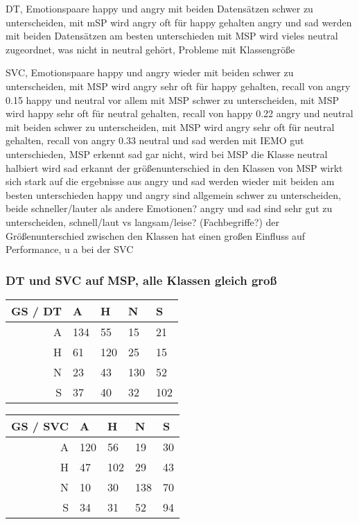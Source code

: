\documentclass{article} %
\begin{document}
DT, Emotionspaare
happy und angry mit beiden Datensätzen schwer zu unterscheiden, mit mSP wird angry oft für happy gehalten
angry und sad werden mit beiden Datensätzen am besten unterschieden
mit MSP wird vieles neutral zugeordnet, was nicht in neutral gehört, Probleme mit Klassengröße

SVC, Emotionspaare
happy und angry wieder mit beiden schwer zu unterscheiden, mit MSP wird angry sehr oft für happy gehalten, recall von angry 0.15
happy und neutral vor allem mit MSP schwer zu unterscheiden, mit MSP wird happy sehr oft für neutral gehalten, recall von happy 0.22
angry und neutral mit beiden schwer zu unterscheiden, mit MSP wird angry sehr oft für neutral gehalten, recall von angry 0.33
neutral und sad werden mit IEMO gut unterschieden, MSP erkennt sad gar nicht, wird bei MSP die Klasse neutral halbiert wird sad erkannt
der größenunterschied in den Klassen von MSP wirkt sich stark auf die ergebnisse aus
angry und sad werden wieder mit beiden am besten unterschieden
happy und angry sind allgemein schwer zu unterscheiden, beide schneller/lauter als andere Emotionen?
angry und sad sind sehr gut zu unterscheiden, schnell/laut vs langsam/leise? (Fachbegriffe?)
der Größenunterschied zwischen den Klassen hat einen großen Einfluss auf Performance, u a bei der SVC

\subsubsection{DT und SVC auf MSP, alle Klassen gleich groß}

\begin{tabular}{|r|llll|}
\hline
GS / DT & A & H & N & S \\
\hline
A & 134 & 55 & 15 & 21 \\
H & 61 & 120 & 25 & 15 \\
N & 23 & 43 & 130 & 52 \\
S & 37 & 40 & 32 & 102 \\
\hline
\end{tabular}
\begin{tabular}{|r|llll|}
\hline
GS / SVC & A & H & N & S \\
\hline
A & 120 & 56 & 19 & 30 \\
H & 47 & 102 & 29 & 43 \\
N & 10 & 30 & 138 & 70 \\
S & 34 & 31 & 52 & 94 \\
\hline
\end{tabular} \\
\end{document}
